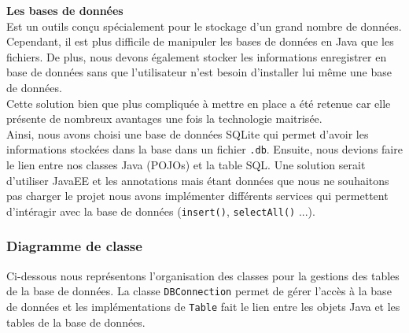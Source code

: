 \documentclass[10pt,a4paper]{article}
\begin{document}
\textbf{Les bases de données} \\
Est un outils conçu spécialement pour le stockage d'un grand nombre de données. Cependant, il est plus difficile de manipuler les bases de données en Java que les fichiers. De plus, nous devons également stocker les informations enregistrer en base de données sans que l'utilisateur n'est besoin d'installer lui même une base de données. \\
Cette solution bien que plus compliquée à mettre en place a été retenue car elle présente de nombreux avantages une fois la technologie maitrisée. \\

Ainsi, nous avons choisi une base de données SQLite qui permet d'avoir les informations stockées dans la base dans un fichier \verb|.db|. Ensuite, nous devions faire le lien entre nos classes Java (POJOs) et la table SQL. Une solution serait d'utiliser JavaEE et les annotations mais étant données que nous ne souhaitons pas charger le projet nous avons implémenter différents services qui permettent d'intéragir avec la base de données (\verb|insert()|, \verb|selectAll()| ...).

\subsubsection{Diagramme de classe}
Ci-dessous nous représentons l'organisation des classes pour la gestions des tables de la base de données.
La classe \verb|DBConnection| permet de gérer l'accès à la base de données et les implémentations de \verb|Table| fait le lien entre les objets Java et les tables de la base de données.
\end{document}
